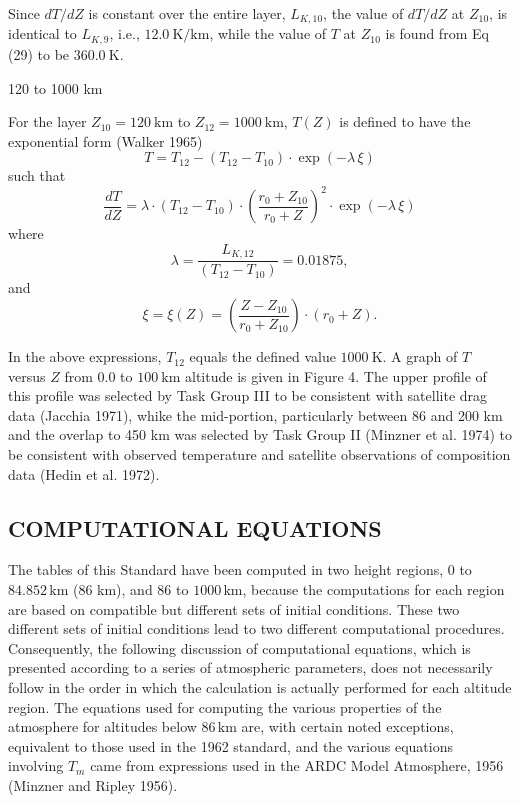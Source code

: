 \documentclass{article}
\begin{document}
Since $dT/dZ$ is constant over the entire layer, $L_{K,10}$, the value of $dT/dZ$ at $Z_{10}$, is identical to $L_{K,9}$, i.e., $12.0~\text{K/km}$, while the value of $T$ at $Z_{10}$ is found from Eq (29) to be $360.0~\text{K}$.

120 to 1000 km

For the layer $Z_{10} = 120~\text{km}$ to $Z_{12} = 1000~\text{km}$, $T(Z)$ is defined to have the exponential form (Walker 1965)
\[
T = T_{12} - (T_{12} - T_{10}) \cdot \exp(-\lambda \, \xi) \tag{31}
\]
such that
\[
\frac{dT}{dZ} = \lambda \cdot (T_{12} - T_{10}) \cdot \left(\frac{r_0 + Z_{10}}{r_0 + Z}\right)^2 \cdot \exp(-\lambda \, \xi) \tag{32}
\]
where
\[
\lambda = \frac{L_{K,12}}{(T_{12} - T_{10})} = 0.01875,
\]
and
\[
\xi = \xi(Z) = \left(\frac{Z - Z_{10}}{r_0 + Z_{10}}\right) \cdot (r_0 + Z).
\]

In the above expressions, $T_{12}$ equals the defined value $1000~\text{K}$. A graph of $T$ versus $Z$ from $0.0$ to $100~\text{km}$ altitude is given in Figure 4. The upper profile of this profile was selected by Task Group III to be consistent with satellite drag data (Jacchia 1971), whike the mid-portion, particularly between 86 and 200 km and the overlap to 450 km was selected by Task Group II (Minzner et al. 1974) to be consistent with observed temperature and satellite observations of composition data (Hedin et al. 1972).

\subsection{COMPUTATIONAL EQUATIONS}

The tables of this Standard have been computed in two height regions, $0$ to $84.852 \, \text{km}$ (86 km), and $86$ to $1000 \, \text{km}$, because the computations for each region are based on compatible but different sets of initial conditions. These two different sets of initial conditions lead to two different computational procedures. Consequently, the following discussion of computational equations, which is presented according to a series of atmospheric parameters, does not necessarily follow in the order in which the calculation is actually performed for each altitude region. The equations used for computing the various properties of the atmosphere for altitudes below $86 \, \text{km}$ are, with certain noted exceptions, equivalent to those used in the 1962 standard, and the various equations involving $T_m$ came from expressions used in the ARDC Model Atmosphere, 1956 (Minzner and Ripley 1956).\\
\end{document}
